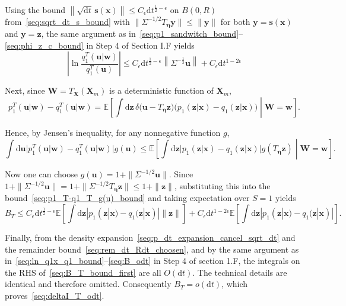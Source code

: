 \documentclass[
 longbibliography,
 twocolumn,
 superscriptaddress,
 amsmath,
 amssymb,
 amsthm,
 amsfonts,
 prl,
 floatfix,
]{revtex4-2}
\newcommand{\matbf}[1]{\boldsymbol{\mathsf{#1}}}
\begin{document}
\begin{widetext}
Using the bound $\left\|\sqrt{\mathrm dt}\,\bm s(\bm x)\right\|\leq
C_{\epsilon}\mathrm dt^{\frac{1}{2}-\epsilon}$ on $B(0,R)$ from~\eqref{seq:sqrt_dt_s_bound} with $\|\matbf\Sigma^{-1/2}T_{\bm\eta}\bm y\|\leq\|\bm y\|$ for both $\bm y=\bm s(\bm x)$ and $\bm y=\bm z$, the same argument as in~\eqref{seq:p1_sandwitch_bound}--\eqref{seq:phi_z_c_bound} in Step 4 of Section I.F yields
\begin{equation}
    \left|\ln\frac{q_1^T(\bm u|\bm w)}{q_1^T(\bm u)}\right|
    \leq C_\epsilon\mathrm dt^{\frac{1}{2}-\epsilon}
    \left\|\matbf\Sigma^{-\frac{1}{2}}\bm u\right\|
    +C_\epsilon\mathrm dt^{1-2\epsilon}
    \label{seq:ln_q1Tw_q1T_bound}
\end{equation}

Next, since $\bm W=T_{\bm X}(\bm X_m)$ is a deterministic function of $\bm X_m$,
\[
    p_1^T(\bm u|\bm w)-q_1^T(\bm u|\bm w)=\mathbb E\!\left[
    \int\mathrm d\bm z\,\delta\big(\bm u-T_{\bm\eta}\bm z\big)
    \big(p_1(\bm z|\bm x)-q_1(\bm z|\bm x)\big)
    \middle|\bm W=\bm w\right].
\]

Hence, by Jensen's inequality, for any nonnegative function $g$,
\begin{equation}
    \int \mathrm d\bm u\big|p_1^T(\bm u|\bm w)-q_1^T(\bm u|\bm w)\big|g(\bm u)
    \leq\mathbb E\!\left[\int\mathrm d\bm z\big|p_1(\bm z|\bm x)-q_1(\bm z|\bm x)\big|g(T_{\bm\eta}\bm z)
    \middle|\bm W=\bm w\right].
    \label{seq:p1_T-q1_T_g(u)_bound}
\end{equation}

Now one can choose $g(\bm u)=1+\|\matbf\Sigma^{-1/2}\bm u\|$. Since $1+\|\matbf\Sigma^{-1/2}\bm u\|=1+\|\matbf\Sigma^{-1/2}T_{\bm\eta}\bm z\|\leq1+\|\bm z\|$, substituting this into the bound~\eqref{seq:p1_T-q1_T_g(u)_bound} and taking expectation over $S=1$ yields
\begin{equation}
    B_T\leq C_\epsilon\mathrm dt^{\frac{1}{2}-\epsilon}\mathbb E\!\left[
    \int\mathrm d\bm z|p_1(\bm z|\bm x)-q_1(\bm z|\bm x)|\|\bm z\|
    \right]
    +C_\epsilon\mathrm dt^{1-2\epsilon}\mathbb E\!\left[
    \int\mathrm d\bm z|p_1(\bm z|\bm x)-q_1(\bm z|\bm x)|\right].
    \label{seq:B_T_bound_first}
\end{equation}

Finally, from the density expansion~\eqref{seq:p_dt_expansion_cancel_sqrt_dt} and the remainder bound~\eqref{seq:rem_dt_Rdt_choosen}, and by the same argument as in~\eqref{seq:ln_q1x_q1_bound}--\eqref{seq:B_odt} in Step 4 of section 1.F, the integrals on the RHS of~\eqref{seq:B_T_bound_first} are all $O(\mathrm dt)$. The technical details are identical and therefore omitted. Consequently $B_T=o(\mathrm dt)$, which proves~\eqref{seq:deltaI_T_odt}.


\end{widetext}
\end{document}
